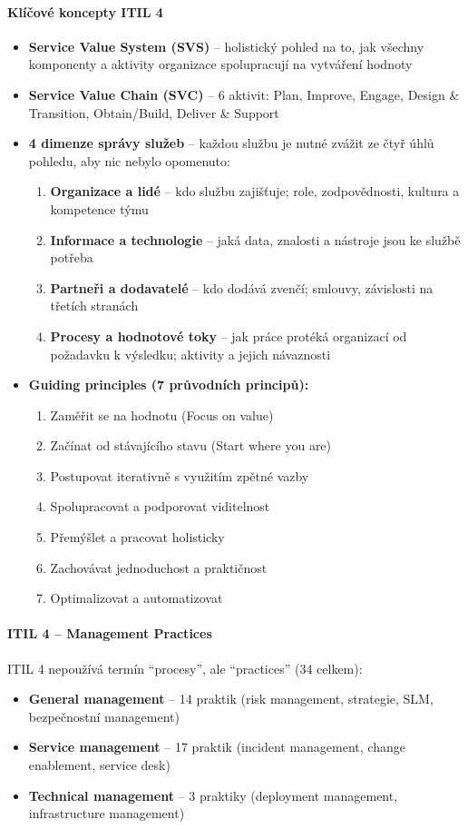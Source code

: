 \paragraph{Klíčové koncepty ITIL 4}
\begin{itemize}
  \item \textbf{Service Value System (SVS)} -- holistický pohled na to, jak všechny komponenty a aktivity
    organizace spolupracují na vytváření hodnoty
  \item \textbf{Service Value Chain (SVC)} -- 6 aktivit: Plan, Improve, Engage, Design \& Transition, Obtain/Build, Deliver \& Support
  \item \textbf{4 dimenze správy služeb} -- každou službu je nutné zvážit ze čtyř úhlů pohledu,
    aby nic nebylo opomenuto:
    \begin{enumerate}
      \item \textbf{Organizace a lidé} -- kdo službu zajišťuje; role, zodpovědnosti, kultura a kompetence týmu
      \item \textbf{Informace a technologie} -- jaká data, znalosti a nástroje jsou ke službě potřeba
      \item \textbf{Partneři a dodavatelé} -- kdo dodává zvenčí; smlouvy, závislosti na třetích stranách
      \item \textbf{Procesy a hodnotové toky} -- jak práce protéká organizací od požadavku k výsledku; aktivity a jejich návaznosti
    \end{enumerate}
  \item \textbf{Guiding principles (7 průvodních principů):}
    \begin{enumerate}
      \item Zaměřit se na hodnotu (Focus on value)
      \item Začínat od stávajícího stavu (Start where you are)
      \item Postupovat iterativně s využitím zpětné vazby
      \item Spolupracovat a podporovat viditelnost
      \item Přemýšlet a pracovat holisticky
      \item Zachovávat jednoduchost a praktičnost
      \item Optimalizovat a automatizovat
    \end{enumerate}
\end{itemize}

\paragraph{ITIL 4 -- Management Practices}
ITIL 4 nepoužívá termín ``procesy'', ale ``practices'' (34 celkem):
\begin{itemize}
  \item \textbf{General management} -- 14 praktik (risk management, strategie, SLM, bezpečnostní management)
  \item \textbf{Service management} -- 17 praktik (incident management, change enablement, service desk)
  \item \textbf{Technical management} -- 3 praktiky (deployment management, infrastructure management)
\end{itemize}

